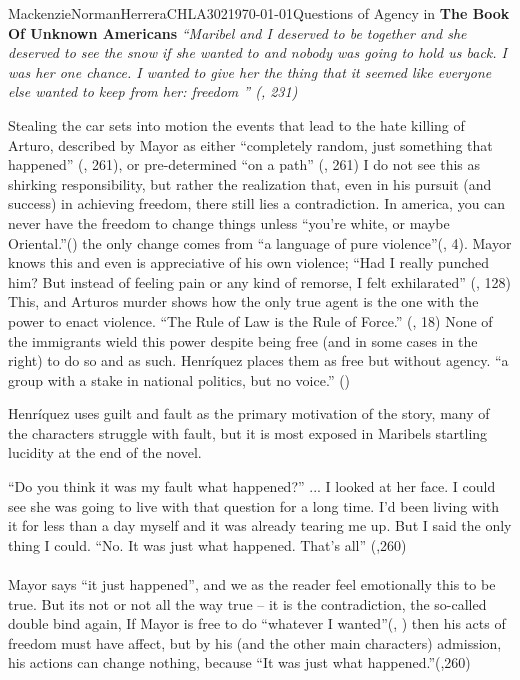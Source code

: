 \documentclass{article}
\begin{document}
\begin{mla}{Mackenzie}{Norman}{Herrera}{CHLA302}{\today}{Questions of Agency in \textbf{The Book Of Unknown Americans}}
\textit{``Maribel and I deserved to be together and she deserved to see the snow if she wanted to and nobody was going to hold us back. I was her one chance. I wanted to give her the thing that it seemed like everyone else wanted to keep from her: freedom '' (\cite{Henriquez2014-sh}, 231)}

Stealing the car sets into motion the events that lead to the hate killing of Arturo, described by Mayor as either ``completely random, just something that happened'' (\cite{Henriquez2014-sh}, 261), or pre-determined ``on a path'' (\cite{Henriquez2014-sh}, 261) I do not see this as shirking responsibility, but rather the realization that, even in his pursuit (and success) in achieving freedom, there still lies a contradiction. In america, you can never have the freedom to change things unless ``you're white, or maybe Oriental.''(\cite{Henriquez2014-sh}) the only change comes from ``a language of pure violence''(\cite{wretched}, 4). Mayor knows this and even is appreciative of his own violence; ``Had I really punched him? But instead of feeling pain or any kind of remorse, I felt exhilarated'' (\cite{Henriquez2014-sh}, 128) This, and Arturos murder shows how the only true agent is the one with the power to enact violence. ``The Rule of Law is the Rule of Force.'' (\cite{loves-bdy}, 18) None of the immigrants wield this power despite being free (and in some cases in the right) to do so and as such. Henríquez places them as free but without agency. ``a group with a stake in national politics, but no voice.'' (\cite{Lutes_Travis_2021})

Henríquez uses guilt and fault as the primary motivation of the story, many of the characters struggle with fault, but it is most exposed in Maribels startling lucidity at the end of the novel.

\noindent\linebreak
``Do you think it was my fault what happened?'' 
\noindent\linebreak
...
\noindent\linebreak
I looked at her face. I could see she was going to live with that question for a long time. I'd been living with it for less than a day myself and it was already tearing me up. But I said the only thing I could. ``No. It was just what happened. That's all'' (\cite{Henriquez2014-sh},260)
\paragraph{}
Mayor says ``it just happened'', and we as the reader feel emotionally this to be true. But its not or not all the way true -- it is the contradiction, the so-called double bind again, If Mayor is free to do ``whatever I wanted''(\cite{Henriquez2014-sh}, ) then his acts of freedom must have affect, but by his (and the other main characters) admission, his actions can change nothing, because ``It was just what happened.''(\cite{Henriquez2014-sh},260)


\end{mla}
\end{document}
